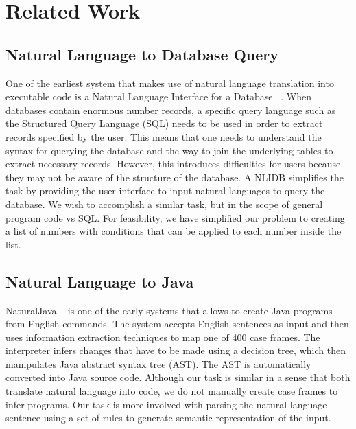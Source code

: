 \documentclass[11pt,letterpaper]{article}
\begin{document}
\section{Related Work}

\subsection{Natural Language to Database Query}

One of the earliest system that makes use of natural language translation into executable code is a Natural Language Interface for a Database ~\cite{Androutsopoulos1995NaturalLI}. 
When databases contain enormous number records, a specific query language such as the Structured Query Language (SQL) needs to be used in order to extract records specified by the user. 
This means that one needs to understand the syntax for querying the database and the way to join the underlying tables to extract necessary records. 
However, this introduces difficulties for users because they may not be aware of the structure of the database. 
A NLIDB simplifies the task by providing the user interface to input natural languages to query the database.
We wish to accomplish a similar task, but in the scope of general program code vs SQL.
For feasibility, we have simplified our problem to creating a list of numbers with conditions that can be applied to each number inside the list.   

\subsection{Natural Language to Java}
NaturalJava ~\cite{Price2000NaturalJavaAN} is one of the early systems that 
allows to create Java programs from English commands. 
The system accepts English sentences as input and then uses information extraction techniques to map one of 400 case frames. 
The interpreter infers changes that have to be made using a decision tree, which then manipulates Java abstract syntax tree (AST). 
The AST is automatically converted into Java source code. Although our task is similar in a sense that both translate natural language into code, we do not manually create case frames to infer programs. 
Our task is more involved with parsing the natural language sentence using a set of rules to generate semantic representation of the input.
\end{document}
